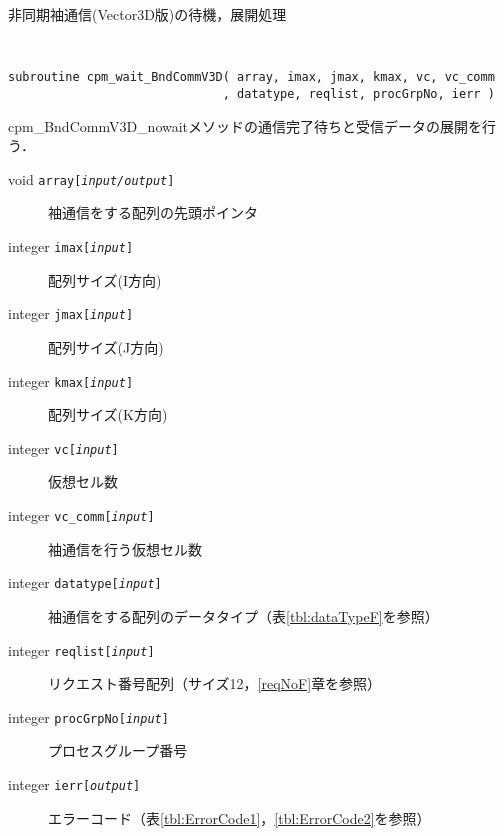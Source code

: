\begin{spacing}{0.8}
\begin{itembox}[l]{非同期袖通信(Vector3D版)の待機，展開処理}
{\tt
\begin{verbatim}
subroutine cpm_wait_BndCommV3D( array, imax, jmax, kmax, vc, vc_comm
                              , datatype, reqlist, procGrpNo, ierr )
\end{verbatim}
}
cpm\_BndCommV3D\_nowaitメソッドの通信完了待ちと受信データの展開を行う．
\begin{description}
\item[void    {\tt array[{\it input/output}]}] 袖通信をする配列の先頭ポインタ
\item[integer {\tt imax[{\it input}]}] 配列サイズ(I方向)
\item[integer {\tt jmax[{\it input}]}] 配列サイズ(J方向)
\item[integer {\tt kmax[{\it input}]}] 配列サイズ(K方向)
\item[integer {\tt vc[{\it input}]}] 仮想セル数
\item[integer {\tt vc\_comm[{\it input}]}] 袖通信を行う仮想セル数
\item[integer {\tt datatype[{\it input}]}] 袖通信をする配列のデータタイプ（表\ref{tbl:dataTypeF}を参照）
\item[integer {\tt reqlist[{\it input}]}] リクエスト番号配列（サイズ12，\ref{reqNoF}章を参照）
\item[integer {\tt procGrpNo[{\it input}]}] プロセスグループ番号
\item[integer {\tt ierr[{\it output}]}] エラーコード（表\ref{tbl:ErrorCode1}，\ref{tbl:ErrorCode2}を参照）
\end{description}
\end{itembox}\\
\end{spacing}

